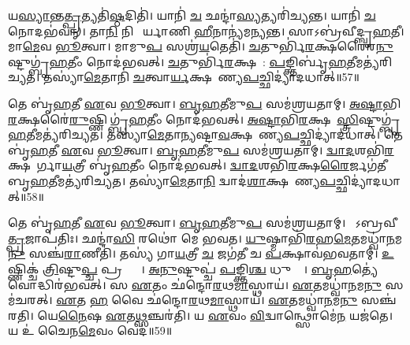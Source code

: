 𑌯\ul{𑌸𑍍𑌯𑌾}𑌨𑍍𑌤\ul{𑌤𑍍𑌪𑍍𑌰}𑌤𑍍𑌯𑌤𑌿॑\ul{𑌷𑍍𑌠}𑌦𑌿𑌤𑌿॑।
𑌯𑌾𑌨𑌿॑ \ul{𑌚} 𑌛𑌨𑍍𑌦𑌾॑\ul{𑌸𑍍𑌯}𑌤𑍍𑌯𑌰𑌿॑𑌚𑍍𑌯𑌨𑍍𑌤।
𑌯𑌾𑌨𑌿॑ \ul{𑌚} 𑌨𑍋𑌦𑌭॑𑌵𑌨𑍍।
𑌤𑌾\ul{𑌨𑌿} 𑌨𑌿𑌰𑍍𑌵𑍀᳚𑌰𑍍𑌯𑌾𑌣𑌿 \ul{𑌹𑍀}𑌨𑌾𑌨𑍍𑌯॑𑌮𑌨𑍍𑌯𑌨𑍍𑌤।
𑌸𑌾𑌽𑌬𑍍𑌰॑𑌵𑍀𑌦𑍍𑌬𑍃\ul{𑌹}𑌤𑍀।
𑌮𑌾\ul{𑌮𑍇}𑌵 \ul{𑌭𑍂}𑌤𑍍𑌵𑌾।
𑌮𑌾𑌮𑍁\ul{𑌪} 𑌸𑌶𑍍𑌰॑\ul{𑌯}𑌤𑍇𑌤𑌿॑।
\ul{𑌚}𑌤𑍁𑌰𑍍𑌭𑌿॑\ul{𑌰}𑌕𑍍𑌷𑌰𑍈॑𑌰\ul{𑌨𑍁}𑌷𑍍𑌟𑍁𑌗𑍍𑌬𑍃॑\ul{𑌹}𑌤𑍀𑌂 𑌨𑍋𑌦॑𑌭𑌵𑌤𑍍।
\ul{𑌚}𑌤𑍁𑌰𑍍𑌭𑌿॑\ul{𑌰}𑌕𑍍𑌷𑌰𑍈᳚: \ul{𑌪}𑌙𑍍𑌕𑍍𑌤𑌿𑌰𑍍𑌬𑍃॑\ul{𑌹}𑌤𑍀\-𑌮𑌤𑍍𑌯॑𑌰𑌿𑌚𑍍𑌯𑌤।
𑌤𑌸𑍍𑌯𑌾॑\ul{𑌮𑍇}𑌤𑌾𑌨𑌿॑ \ul{𑌚}𑌤𑍍𑌵𑌾\ul{𑌰𑍍𑌯}𑌕𑍍𑌷𑌰𑌾᳚𑌣𑍍𑌯\ul{𑌪}𑌚𑍍𑌛𑌿𑌦𑍍𑌯𑌾॑\-𑌦𑌧𑌾𑌤𑍍॥57॥

𑌤𑍇 𑌬𑍃॑\ul{𑌹}𑌤𑍀 \ul{𑌏}𑌵 \ul{𑌭𑍂}𑌤𑍍𑌵𑌾।
\ul{𑌬𑍃}\ul{𑌹}𑌤𑍀𑌮𑍁\ul{𑌪} 𑌸𑌮॑𑌶𑍍𑌰𑌯𑌤𑌾𑌮𑍍।
\ul{𑌅}\ul{𑌷𑍍𑌟𑌾}𑌭𑌿\-\ul{𑌰}𑌕𑍍𑌷𑌰𑍈॑\ul{𑌰𑍁}𑌷𑍍𑌣𑌿𑌗𑍍𑌬𑍃॑\ul{𑌹}𑌤𑍀𑌂 𑌨𑍋𑌦॑𑌭𑌵𑌤𑍍।
\ul{𑌅}\ul{𑌷𑍍𑌟𑌾}𑌭𑌿\-\ul{𑌰}𑌕𑍍𑌷𑌰𑍈᳚\ul{𑌸𑍍𑌤𑍍𑌰𑌿}𑌷𑍍𑌟𑍁𑌗𑍍𑌬𑍃॑\ul{𑌹}𑌤𑍀\-𑌮𑌤𑍍𑌯॑\-𑌰𑌿𑌚𑍍𑌯𑌤।
𑌤𑌸𑍍𑌯𑌾॑\ul{𑌮𑍇}𑌤𑌾\ul{𑌨𑍍𑌯}𑌷𑍍𑌟𑌾\ul{𑌵}𑌕𑍍𑌷𑌰𑌾᳚𑌣𑍍𑌯\ul{𑌪}𑌚𑍍𑌛𑌿𑌦𑍍𑌯𑌾॑\-𑌦𑌧𑌾𑌤𑍍।
𑌤𑍇 𑌬𑍃॑\ul{𑌹}𑌤𑍀 \ul{𑌏}𑌵 \ul{𑌭𑍂}𑌤𑍍𑌵𑌾।
\ul{𑌬𑍃}\ul{𑌹}𑌤𑍀𑌮𑍁\ul{𑌪} 𑌸𑌮॑𑌶𑍍𑌰𑌯𑌤𑌾𑌮𑍍।
\ul{𑌦𑍍𑌵𑌾}\ul{𑌦}𑌶𑌭𑌿॑\ul{𑌰}𑌕𑍍𑌷𑌰𑍈᳚𑌰𑍍𑌗𑌾\ul{𑌯}𑌤𑍍𑌰𑍀 𑌬𑍃॑\ul{𑌹}𑌤𑍀𑌂 𑌨𑍋𑌦॑𑌭𑌵𑌤𑍍।
\ul{𑌦𑍍𑌵𑌾}\ul{𑌦}𑌶𑌭𑌿॑\ul{𑌰}𑌕𑍍𑌷\ul{𑌰𑍈}𑌰𑍍𑌜𑌗॑𑌤𑍀 𑌬𑍃\ul{𑌹}𑌤𑍀𑌮𑌤𑍍𑌯॑𑌰𑌿𑌚𑍍𑌯𑌤।
𑌤𑌸𑍍𑌯𑌾॑\ul{𑌮𑍇}𑌤𑌾\ul{𑌨𑌿} 𑌦𑍍𑌵𑌾𑌦॑\ul{𑌶𑌾}𑌕𑍍𑌷𑌰𑌾᳚𑌣𑍍𑌯\ul{𑌪}𑌚𑍍𑌛𑌿𑌦𑍍𑌯𑌾॑\-𑌦𑌧𑌾𑌤𑍍॥58॥

𑌤𑍇 𑌬𑍃॑\ul{𑌹}𑌤𑍀 \ul{𑌏}𑌵 \ul{𑌭𑍂}𑌤𑍍𑌵𑌾।
\ul{𑌬𑍃}\ul{𑌹}𑌤𑍀𑌮𑍁\ul{𑌪} 𑌸𑌮॑𑌶𑍍𑌰𑌯𑌤𑌾𑌮𑍍।
𑌸𑍋᳚𑌽𑌬𑍍𑌰𑌵𑍀\ul{𑌤𑍍𑌪𑍍𑌰}𑌜𑌾𑌪॑𑌤𑌿𑌃।
𑌛𑌨𑍍𑌦𑌾॑\ul{𑌸𑌿} 𑌰𑌥𑍋॑ 𑌮𑍇 𑌭𑌵𑌤।
\ul{𑌯𑍁}𑌷𑍍𑌮𑌾𑌭𑌿॑\ul{𑌰}𑌹\ul{𑌮𑍇}𑌤𑌮𑌧𑍍𑌵𑌾॑\ul{𑌨}𑌮\ul{𑌨𑍁} 𑌸𑌞𑍍𑌚॑\ul{𑌰𑌾}𑌣𑍀𑌤𑌿॑।
𑌤𑌸𑍍𑌯॑ 𑌗𑌾\ul{𑌯}𑌤𑍍𑌰𑍀 \ul{𑌚} 𑌜𑌗॑𑌤𑍀 𑌚 \ul{𑌪}𑌕𑍍𑌷𑌾𑌵॑𑌭𑌵𑌤𑌾𑌮𑍍।
\ul{𑌉}𑌷𑍍𑌣𑌿𑌕𑍍𑌚॑ \ul{𑌤𑍍𑌰𑌿}𑌷𑍍𑌟𑍁\ul{𑌪𑍍𑌚} 𑌪𑍍𑌰𑌷𑍍𑌟𑍍𑌯𑍗᳚।
\ul{𑌅}\ul{𑌨𑍁}𑌷𑍍𑌟𑍁𑌪𑍍𑌚॑ \ul{𑌪}𑌙𑍍𑌕𑍍𑌤𑌿\ul{𑌶𑍍𑌚} 𑌧𑍁𑌰𑍍𑌯𑍗᳚।
\ul{𑌬𑍃}\ul{𑌹}𑌤𑍍𑌯𑍇॑𑌵𑍋𑌦𑍍𑌧𑌿𑌰॑𑌭𑌵𑌤𑍍।
𑌸 \ul{𑌏}𑌤𑌂 𑌛॑𑌨𑍍𑌦𑍋\ul{𑌰}𑌥\ul{𑌮𑌾}𑌸𑍍𑌥𑌾𑌯॑।
\ul{𑌏}𑌤𑌮𑌧𑍍𑌵𑌾॑\ul{𑌨}𑌮\ul{𑌨𑍁} 𑌸𑌮॑𑌚𑌰𑌤𑍍।
\ul{𑌏}𑌤 \ul{𑌹} 𑌵𑍈 𑌛॑𑌨𑍍𑌦𑍋\ul{𑌰}𑌥\ul{𑌮𑌾}𑌸𑍍𑌥𑌾𑌯॑।
\ul{𑌏}𑌤𑌮𑌧𑍍𑌵𑌾॑\ul{𑌨}𑌮\ul{𑌨𑍁} 𑌸𑌞𑍍𑌚॑𑌰𑌤𑌿।
𑌯𑍇\ul{𑌨𑍈}𑌷 \ul{𑌏}𑌤\ul{𑌥𑍍𑌸}𑌞𑍍𑌚𑌰॑𑌤𑌿।
𑌯 \ul{𑌏}𑌵𑌂 \ul{𑌵𑌿}𑌦𑍍𑌵𑌾𑌨𑍍𑌥𑍍𑌸𑍋𑌮𑍇॑\ul{𑌨} 𑌯𑌜॑𑌤𑍇।
𑌯 𑌉॑ 𑌚𑍈𑌨\ul{𑌮𑍇}𑌵𑌂 𑌵𑍇𑌦॑॥59॥\anuvakamend[\ul{𑌅}\ul{𑌭}\ul{𑌵}𑌨𑍍𑌵𑌾𑌵 𑌸𑌾 \ul{𑌦𑍇}𑌵𑌾𑌕𑍍𑌷॑𑌰𑌾 𑌬𑍃\ul{𑌹}𑌤𑍍𑌯॑𑌦\ul{𑌧𑌾}𑌦𑍍𑌦𑍍𑌵𑌾𑌦॑\ul{𑌶𑌾}𑌕𑍍𑌷𑌰𑌾᳚𑌣𑍍𑌯\ul{𑌪}𑌚𑍍𑌛𑌿𑌦𑍍𑌯𑌾॑𑌦𑌧𑌾\ul{𑌦𑌾}𑌸𑍍𑌥𑌾\ul{𑌯} 𑌷𑌟𑍍𑌚॑]






\clearpage
{}
\setcounter{anuvakam}{0}


